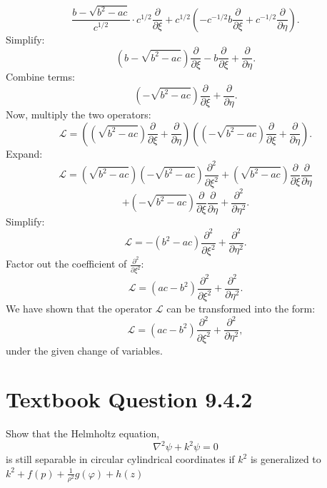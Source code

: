 \documentclass[12pt]{article}
\begin{document}
        \[
        \frac{b - \sqrt{b^2 - ac}}{c^{1/2}} \cdot c^{1/2} \frac{\partial}{\partial \xi} + c^{1/2} \left(-c^{-1/2}b \frac{\partial}{\partial \xi} + c^{-1/2} \frac{\partial}{\partial \eta} \right).
        \]
        Simplify:
        \[
        \left(b - \sqrt{b^2 - ac}\right) \frac{\partial}{\partial \xi} - b \frac{\partial}{\partial \xi} + \frac{\partial}{\partial \eta}.
        \]
        Combine terms:
        \[
        \left(-\sqrt{b^2 - ac}\right) \frac{\partial}{\partial \xi} + \frac{\partial}{\partial \eta}.
        \]
        Now, multiply the two operators:
        \[
        \mathcal{L} = \left( \left(\sqrt{b^2 - ac}\right) \frac{\partial}{\partial \xi} + \frac{\partial}{\partial \eta} \right) \left( \left(-\sqrt{b^2 - ac}\right) \frac{\partial}{\partial \xi} + \frac{\partial}{\partial \eta} \right).
        \]
        Expand:
        \[
        \mathcal{L} = (\sqrt{b^2 - ac})(-\sqrt{b^2 - ac}) \frac{\partial^2}{\partial \xi^2} + (\sqrt{b^2 - ac}) \frac{\partial}{\partial \xi} \frac{\partial}{\partial \eta}
        \]
        \[
        + (-\sqrt{b^2 - ac}) \frac{\partial}{\partial \xi} \frac{\partial}{\partial \eta} + \frac{\partial^2}{\partial \eta^2}.
        \]
        Simplify:
        \[
        \mathcal{L} = -(b^2 - ac) \frac{\partial^2}{\partial \xi^2} + \frac{\partial^2}{\partial \eta^2}.
        \]
        Factor out the coefficient of \(\frac{\partial^2}{\partial \xi^2}\):
        \[
        \mathcal{L} = (ac - b^2) \frac{\partial^2}{\partial \xi^2} + \frac{\partial^2}{\partial \eta^2}.
        \]
        We have shown that the operator \(\mathcal{L}\) can be transformed into the form:
        \[
        \mathcal{L} = (ac - b^2) \frac{\partial^2}{\partial \xi^2} + \frac{\partial^2}{\partial \eta^2},
        \]
        under the given change of variables.

\section*{Textbook Question 9.4.2}
    Show that the Helmholtz equation,
    \[
        \nabla^2 \psi + k^2 \psi = 0
    \]
    is still separable in circular cylindrical coordinates if $k^2$ is generalized to $k^2 + f(p) + \frac{1}{\rho^2} g(\varphi) + h(z)$
   
\end{document}

